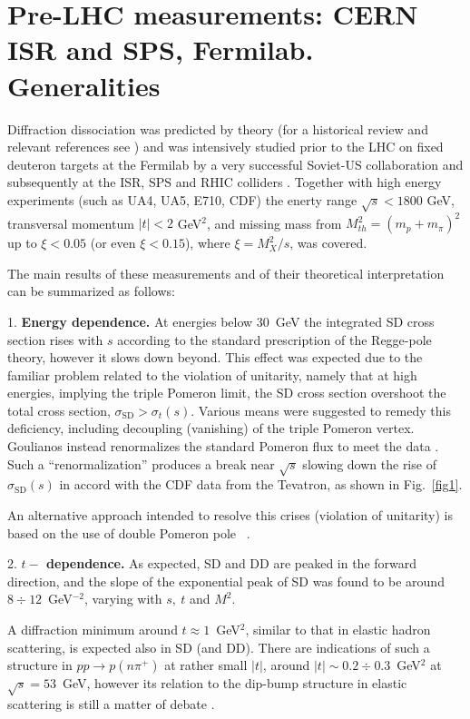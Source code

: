 \documentclass[12pt]{article}
\begin{document}
\section{Pre-LHC measurements: CERN ISR and SPS, Fermilab. Generalities} \label{sec:preLHC}
Diffraction dissociation was predicted by theory (for a historical review and relevant references see \cite{Goulianos, Kaidalov, Zotov}) and was intensively studied prior to the LHC on fixed deuteron targets at the Fermilab by a very successful Soviet-US collaboration \cite{Akimov}  and subsequently at the ISR, SPS and RHIC colliders \cite{Goulianos, Tsarev}. 
Together with high energy experiments (such as UA4, UA5, E710, CDF) the enerty range  $\sqrt{s}<1800$ GeV, transversal momentum $|t|<2$ GeV$^2$, and missing mass from  $M^2_{th}=(m_p+m_{\pi})^2$ up to $\xi<0.05$ (or even $\xi<0.15$), where $\xi=M^2_X/s$, was covered.

The main results of these measurements and of their theoretical interpretation can be summarized as follows:

1. {\bf Energy dependence.} At energies below 30~GeV the integrated SD cross section rises with $s$ according to the standard prescription of the Regge-pole theory, however it slows down beyond.
This effect was expected due to the familiar problem related to the violation of unitarity, namely that at high energies, implying the triple Pomeron limit, the SD cross section overshoot the total cross section, $\sigma_\mathrm{SD}>\sigma_t(s).$ Various means were suggested \cite{triple} to remedy this deficiency, including decoupling (vanishing) of the triple
Pomeron vertex. Goulianos instead renormalizes the standard Pomeron flux to meet the data \cite{Goulianos1}. Such a ``renormalization'' produces a break near $\sqrt s$ slowing down the rise of $\sigma_\mathrm{SD}(s)$ in accord with the CDF data from the Tevatron, as shown in Fig.~\ref{fig1}.

An alternative approach intended to resolve this crises (violation of unitarity) is based on the use of double Pomeron pole ~\cite{JMPP}.

2. {\bf $t-$ dependence.}
As expected, SD and DD are peaked in the forward direction, and the slope of the exponential peak of SD was found to be around $8\div12$~GeV$^{-2}$, varying with $s,\ t$ and $M^2$.
 
A diffraction minimum around $t\approx 1$~GeV$^2$, similar to that in elastic hadron scattering, is expected also in SD (and DD). There are indications \cite{dip} of such a structure in $pp\rightarrow p(n\pi^+)$ at rather small $|t|$, around $|t|\sim 0.2\div 0.3$~GeV$^2$ at $\sqrt s=53$~GeV, however its relation to the dip-bump structure in elastic scattering is still a matter of debate \cite{JLL}.
\end{document}
